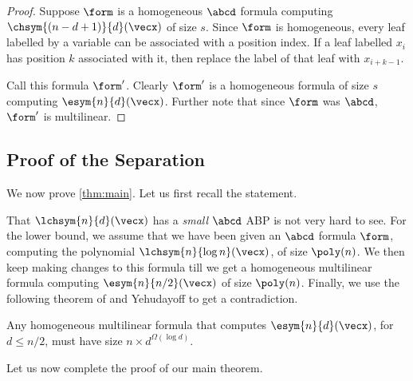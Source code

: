 \begin{proof}
	Suppose $\form$ is a homogeneous $\abcd$ formula computing $\chsym{(n-d+1)}{d}(\vecx)$ of size $s$.
	Since $\form$ is homogeneous, every leaf labelled by a variable can be associated with a position index.
	If a leaf labelled $x_i$ has position $k$ associated with it, then replace the label of that leaf with $x_{i+k-1}$.
	
	Call this formula $\form'$.
	Clearly $\form'$ is a homogeneous formula of size $s$ computing $\esym{n}{d}(\vecx)$.
	Further note that since $\form$ was $\abcd$, $\form'$ is multilinear. 
\end{proof}

\subsection{Proof of the Separation}

We now prove \autoref{thm:main}. 
Let us first recall the statement.

\mainThm*

That $\lchsym{n}{d}(\vecx)$ has a \emph{small} $\abcd$ ABP is not very hard to see.
For the lower bound, we assume that we have been given an $\abcd$ formula $\form$, computing the polynomial $\lchsym{n}{\log n}(\vecx)$, of size $\poly(n)$.
We then keep making changes to this formula till we get a homogeneous multilinear formula computing $\esym{n}{n/2}(\vecx)$ of size $\poly(n)$.
Finally, we use the following theorem of {\Hrubes} and Yehudayoff \cite{HY11} to get a contradiction.

\begin{theorem}\label{thm:hom-ml-lb}
	Any homogeneous multilinear formula that computes $\esym{n}{d}(\vecx)$, for $d \leq n/2$, must have size $n \times d^{\Omega(\log d)}$.
\end{theorem}

\noindent Let us now complete the proof of our main theorem.

